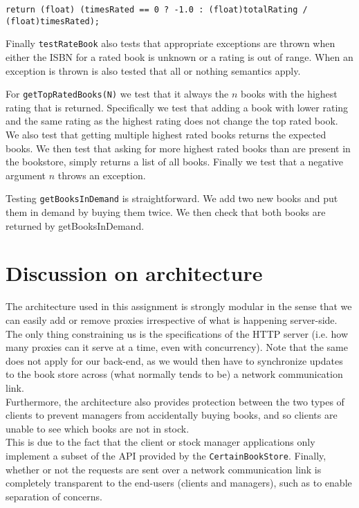 \documentclass[11pt]{article}
\begin{document}
\begin{center}
\texttt{return (float) (timesRated == 0 ? -1.0 : (float)totalRating / (float)timesRated);}
\end{center}

Finally \texttt{testRateBook} also tests that appropriate exceptions are thrown when either the ISBN for a rated book is unknown or a rating is out of range. When an exception is thrown is also tested that all or nothing semantics apply.

For \texttt{getTopRatedBooks(N)} we test that it always the $n$ books with the highest rating that is returned. Specifically we test that adding a book with lower rating and the same rating as the highest rating does not change the top rated book. We also test that getting multiple highest rated books returns the expected books. We then test that asking for more highest rated books than are present in the bookstore, simply returns a list of all books. Finally we test that a negative argument $n$ throws an exception.

Testing \texttt{getBooksInDemand} is straightforward. We add two new books and put them in demand by buying them twice. We then check that both books are returned by getBooksInDemand.

\section*{Discussion on architecture}

The architecture used in this assignment is strongly modular in the sense that
we can easily add or remove proxies irrespective of what is happening
server-side. The only thing constraining us is the specifications of the HTTP
server (i.e. how many proxies can it serve at a time, even with
concurrency). Note that the same does not apply for our back-end, as we would
then have to synchronize updates to the book store across (what normally
tends to be) a network communication link.\\

Furthermore, the architecture also provides protection between the two types of
clients to prevent managers from accidentally buying books, and so clients are
unable to see which books are not in stock.\\

This is due to the fact that the client or stock manager applications only 
implement a subset of the API provided by the \texttt{CertainBookStore}.
Finally, whether or not the requests are sent over a network communication link
is completely transparent to the end-users (clients and managers), such as to
enable separation of concerns.\\
\end{document}
